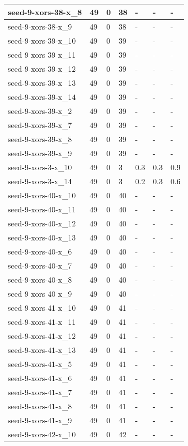 \begin{scriptsize}
\begin{longtable}{|p{5cm}|l|l|l|l|l|l|}
seed-9-xors-38-x\_8&49&0&38&-&-&- \\ \hline 
seed-9-xors-38-x\_9&49&0&38&-&-&- \\ \hline 
seed-9-xors-39-x\_10&49&0&39&-&-&- \\ \hline 
seed-9-xors-39-x\_11&49&0&39&-&-&- \\ \hline 
seed-9-xors-39-x\_12&49&0&39&-&-&- \\ \hline 
seed-9-xors-39-x\_13&49&0&39&-&-&- \\ \hline 
seed-9-xors-39-x\_14&49&0&39&-&-&- \\ \hline 
seed-9-xors-39-x\_2&49&0&39&-&-&- \\ \hline 
seed-9-xors-39-x\_7&49&0&39&-&-&- \\ \hline 
seed-9-xors-39-x\_8&49&0&39&-&-&- \\ \hline 
seed-9-xors-39-x\_9&49&0&39&-&-&- \\ \hline 
seed-9-xors-3-x\_10&49&0&3&0.3&0.3&0.9 \\ \hline 
seed-9-xors-3-x\_14&49&0&3&0.2&0.3&0.6 \\ \hline 
seed-9-xors-40-x\_10&49&0&40&-&-&- \\ \hline 
seed-9-xors-40-x\_11&49&0&40&-&-&- \\ \hline 
seed-9-xors-40-x\_12&49&0&40&-&-&- \\ \hline 
seed-9-xors-40-x\_13&49&0&40&-&-&- \\ \hline 
seed-9-xors-40-x\_6&49&0&40&-&-&- \\ \hline 
seed-9-xors-40-x\_7&49&0&40&-&-&- \\ \hline 
seed-9-xors-40-x\_8&49&0&40&-&-&- \\ \hline 
seed-9-xors-40-x\_9&49&0&40&-&-&- \\ \hline 
seed-9-xors-41-x\_10&49&0&41&-&-&- \\ \hline 
seed-9-xors-41-x\_11&49&0&41&-&-&- \\ \hline 
seed-9-xors-41-x\_12&49&0&41&-&-&- \\ \hline 
seed-9-xors-41-x\_13&49&0&41&-&-&- \\ \hline 
seed-9-xors-41-x\_5&49&0&41&-&-&- \\ \hline 
seed-9-xors-41-x\_6&49&0&41&-&-&- \\ \hline 
seed-9-xors-41-x\_7&49&0&41&-&-&- \\ \hline 
seed-9-xors-41-x\_8&49&0&41&-&-&- \\ \hline 
seed-9-xors-41-x\_9&49&0&41&-&-&- \\ \hline 
seed-9-xors-42-x\_10&49&0&42&-&-&- \\ \hline 

\end{longtable}
\end{scriptsize}
